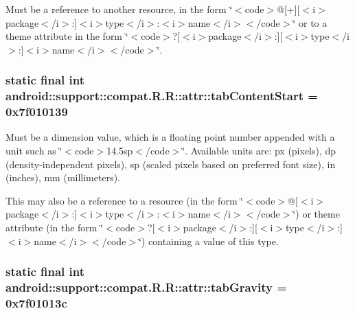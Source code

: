 Must be a reference to another resource, in the form \char`\"{}$<$code$>$@\mbox{[}+\mbox{]}\mbox{[}$<$i$>$package$<$/i$>$:\mbox{]}$<$i$>$type$<$/i$>$:$<$i$>$name$<$/i$>$$<$/code$>$\char`\"{} or to a theme attribute in the form \char`\"{}$<$code$>$?\mbox{[}$<$i$>$package$<$/i$>$:\mbox{]}\mbox{[}$<$i$>$type$<$/i$>$:\mbox{]}$<$i$>$name$<$/i$>$$<$/code$>$\char`\"{}. \hypertarget{classandroid_1_1support_1_1compat_1_1_r_1_1attr_587031190418eca46de8a53a25d65b94}{
\subsubsection[{tabContentStart}]{\setlength{\rightskip}{0pt plus 5cm}static final int android::support::compat.R.R::attr::tabContentStart = 0x7f010139}}
\label{classandroid_1_1support_1_1compat_1_1_r_1_1attr_587031190418eca46de8a53a25d65b94}


Must be a dimension value, which is a floating point number appended with a unit such as \char`\"{}$<$code$>$14.5sp$<$/code$>$\char`\"{}. Available units are: px (pixels), dp (density-independent pixels), sp (scaled pixels based on preferred font size), in (inches), mm (millimeters). 

This may also be a reference to a resource (in the form \char`\"{}$<$code$>$@\mbox{[}$<$i$>$package$<$/i$>$:\mbox{]}$<$i$>$type$<$/i$>$:$<$i$>$name$<$/i$>$$<$/code$>$\char`\"{}) or theme attribute (in the form \char`\"{}$<$code$>$?\mbox{[}$<$i$>$package$<$/i$>$:\mbox{]}\mbox{[}$<$i$>$type$<$/i$>$:\mbox{]}$<$i$>$name$<$/i$>$$<$/code$>$\char`\"{}) containing a value of this type. \hypertarget{classandroid_1_1support_1_1compat_1_1_r_1_1attr_68fb2510f6a6460d81f83a2386c2654d}{
\subsubsection[{tabGravity}]{\setlength{\rightskip}{0pt plus 5cm}static final int android::support::compat.R.R::attr::tabGravity = 0x7f01013c}}
\label{classandroid_1_1support_1_1compat_1_1_r_1_1attr_68fb2510f6a6460d81f83a2386c2654d}


